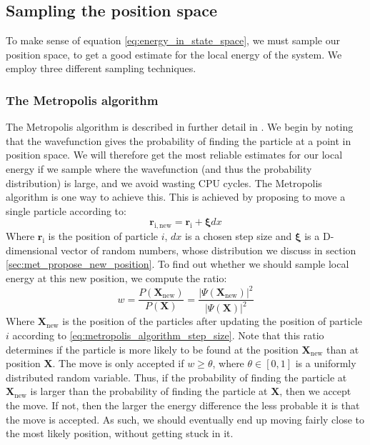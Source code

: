 \documentclass[a4paper, 10pt]{article}
\begin{document}
	\subsection{Sampling the position space}
	To make sense of equation \ref{eq:energy_in_state_space}, we must sample our position space, to get a good estimate for the local energy of the system. We employ three different sampling techniques.	
	\subsubsection{The Metropolis algorithm}
	The Metropolis algorithm is described in further detail in \cite{Hjorth-Jensen2015}. We begin by noting that the wavefunction gives the probability of finding the particle at a point in position space. We will therefore get the most reliable estimates for our local energy if we sample where the wavefunction (and thus the probability distribution) is large, and we avoid wasting CPU cycles. The Metropolis algorithm is one way to achieve this. This is achieved by proposing to move a single particle according to:
	\begin{equation}\label{eq:metropolis_algorithm_step_size}
	\boldsymbol{r}_{\mathrm{i,new}}=\boldsymbol{r}_{\mathrm{i}}+\boldsymbol{\xi}dx
	\end{equation}
	Where $\boldsymbol{r}_{\mathrm{i}}$ is the position of particle $i$, $dx$ is a chosen step size and $\boldsymbol{\xi}$ is a D-dimensional vector of random numbers, whose distribution we discuss in section \ref{sec:met_propose_new_position}. To find out whether we should sample local energy at this new position, we compute the ratio:
	\begin{equation}\label{eq:transition_probability}
	w=\frac{P(\boldsymbol{X}_{\mathrm{new}})}{P(\boldsymbol{X})}=\frac{|\Psi(\boldsymbol{X}_{\mathrm{new}})|^2}{|\Psi(\boldsymbol{X})|^2}
	\end{equation}
	Where $\boldsymbol{X}_{\mathrm{new}}$ is the position of the particles after updating the position of particle $i$ according to \ref{eq:metropolis_algorithm_step_size}. Note that this ratio determines if the particle is more likely to be found at the position $\boldsymbol{X}_{\mathrm{new}}$ than at position $\boldsymbol{X}$. The move is only accepted if $w\geq \theta$, where $\theta\in[0,1]$ is a uniformly distributed random variable. Thus, if the probability of finding the particle at $\mathbf{X}_{\mathrm{new}}$ is larger than the probability of finding the particle at $\mathbf{X}$, then we accept the move. If not, then the larger the energy difference the less probable it is that the move is accepted. As such, we should eventually end up moving fairly close to the most likely position, without getting stuck in it.
\end{document}
